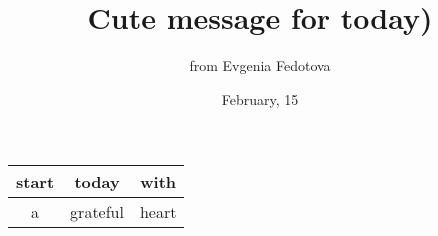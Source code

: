 \documentclass[12pt]{article}
\title{Cute message for today)}
\author{from Evgenia Fedotova}
\date{February, 15}
\begin{document}
\maketitle

\begin{tabular}{|| c | c | c ||}
\hline 
start & today & with \\ 
\hline 
a & grateful & heart \\ 
\hline
\end{tabular} \\
\end{document}
